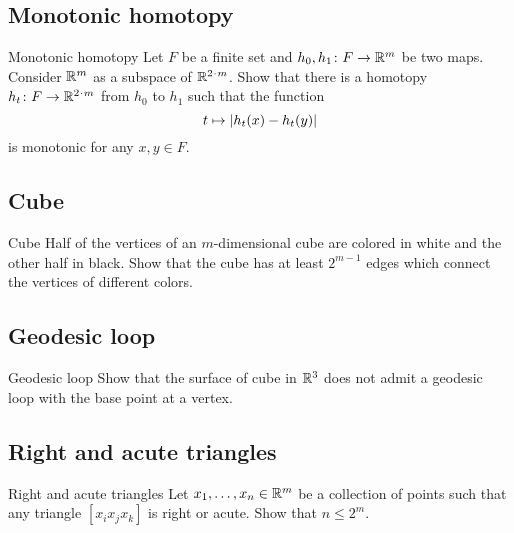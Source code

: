 \subsection*{Monotonic homotopy}
\label{mono-homotopy}

\begin{pr}{}{Monotonic homotopy} 
Let $F$ be a finite set and $h_0,h_1\colon F\to\mathbb{R}^m$ be two maps.
Consider $\mathbb{R}^m$ as a subspace of $\RR^{2\cdot m}$.
Show that there is a homotopy  $h_t\:F\z\to\RR^{2\cdot m}$ from $h_0$ to $h_1$ such that  the function 
\[t\z\mapsto |h_t(x)-h_t(y)|\] 
is monotonic for any $x,y\in F$.
\end{pr}

\subsection*{Cube}

\begin{pr}{}{Cube}\label{Cube}
Half of the vertices 
of an $m$-dimensional cube
are colored in white and the other half in black.
Show that the cube has at least $2^{m-1}$ edges which connect the vertices of different colors. 
\end{pr}

\subsection*{Geodesic loop}

\begin{pr}{}{Geodesic loop}\label{Geodesic loop}
Show that the surface of cube in $\mathbb{R}^3$
does not admit a geodesic loop with the base point at a vertex.
\end{pr}

\subsection*{Right and acute triangles}

\begin{pr}{}{Right and acute triangles}\label{Right and acute triangles}
Let $x_1,\dots,x_n\in\mathbb{R}^m$
be a collection of points such that any triangle $[x_ix_jx_k]$ is right or acute.
Show that $n\le 2^m$.
\end{pr}



